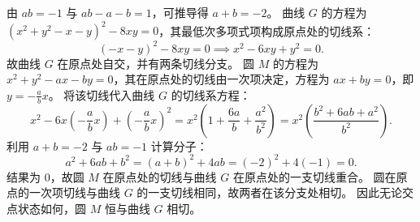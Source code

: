 \begin{solution}
由 $ab = -1$ 与 $ab - a - b = 1$，可推导得 $a + b = -2$。
曲线 $G$ 的方程为 $(x^2 + y^2 - x - y)^2 - 8xy = 0$，其最低次多项式项构成原点处的切线系：
\[ (-x - y)^2 - 8xy = 0 \implies x^2 - 6xy + y^2 = 0. \]
故曲线 $G$ 在原点处自交，并有两条切线分支。
圆 $M$ 的方程为 $x^2 + y^2 - ax - by = 0$，其在原点处的切线由一次项决定，方程为 $ax + by = 0$，即 $y = -\frac{a}{b}x$。
将该切线代入曲线 $G$ 的切线系方程：
\[ x^2 - 6x\left(-\frac{a}{b}x\right) + \left(-\frac{a}{b}x\right)^2 = x^2\left(1 + \frac{6a}{b} + \frac{a^2}{b^2}\right) = x^2\left(\frac{b^2 + 6ab + a^2}{b^2}\right). \]
利用 $a + b = -2$ 与 $ab = -1$ 计算分子：
\[ a^2 + 6ab + b^2 = (a + b)^2 + 4ab = (-2)^2 + 4(-1) = 0. \]
结果为 $0$，故圆 $M$ 在原点处的切线与曲线 $G$ 在原点处的一支切线重合。
圆在原点的一次项切线与曲线 $G$ 的一支切线相同，故两者在该分支处相切。
因此无论交点状态如何，圆 $M$ 恒与曲线 $G$ 相切。
\end{solution}

